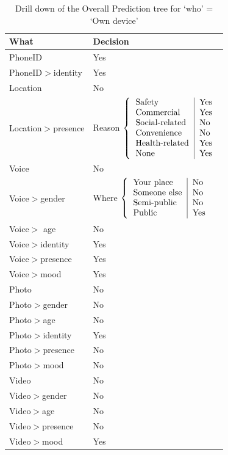 \begin{table}
	\centering
	\caption{Drill down of the Overall Prediction tree for `who' = `Own device'}
	\label{tab:decisions}
	\begin{tabular}{ l | l }
		\hline
		\textbf{What} & \textbf{Decision} \\ \hline
		PhoneID				& Yes			\\
		PhoneID$>$identity 	& Yes			\\
		Location 			& No			\\
		Location$>$presence 	& Reason
		$\left\{
		\begin{tabular}{l | l}
		Safety & Yes \\ 
		Commercial & Yes \\
		Social-related & No \\
		Convenience & No \\
		Health-related & Yes \\
		None & Yes \\
		\end{tabular}\right.$ \\
		Voice 				& No			\\
		Voice$>$gender 		& Where 
		$\left\{
		\begin{tabular}{l | l}
		Your place & No\\
		Someone else & No \\
		Semi-public & No \\
		Public & Yes \\
		\end{tabular}\right.$ \\
		Voice$>$ age 			& No			\\
		Voice$>$identity 		& Yes			\\
		Voice$>$presence 		& Yes			\\
		Voice$>$mood 			& Yes			\\
		Photo 				& No			\\
		Photo$>$gender 		& No			\\
		Photo$>$age 			& No			\\
		Photo$>$identity 		& Yes			\\
		Photo$>$presence 		& No			\\
		Photo$>$mood 			& No			\\
		Video 				& No			\\
		Video$>$gender 		& No			\\
		Video$>$age 			& No			\\
		Video$>$presence 		& No			\\
		Video$>$mood 			& Yes			\\

\end{tabular}
\end{table}
